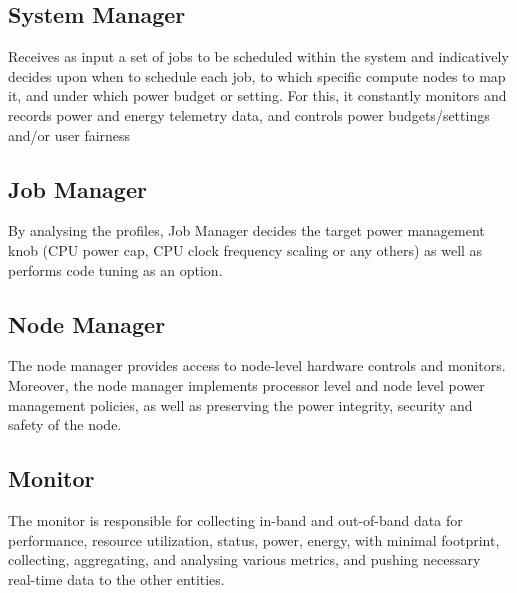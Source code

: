 \subsection{System Manager}
Receives as input a set of jobs to be scheduled within the system and indicatively decides upon when to schedule each job, to which specific compute nodes to map it, and under which power budget or setting. For this, it constantly monitors and records power and energy telemetry data, and controls power budgets/settings and/or user fairness

\subsection{Job Manager}
By analysing the profiles, Job Manager decides the target power management knob (CPU power cap, CPU clock frequency scaling or any others) as well as performs code tuning as an option. 

\subsection{Node Manager}
The node manager provides access to node-level hardware controls and monitors. Moreover, the node manager implements processor level and node level power management policies, as well as preserving the power integrity, security and safety of the node. 

\subsection{Monitor}
The monitor is responsible for collecting in-band and out-of-band data for performance, resource utilization, status, power, energy, with minimal footprint, collecting, aggregating, and analysing various metrics, and pushing necessary real-time data to the other entities.
